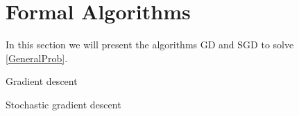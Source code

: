 \section{Formal Algorithms}\label{app:formal_algorithms}
In this section we will present the algorithms GD and SGD to solve \eqref{GeneralProb}.

\begin{algorithm}[H] 
    \caption{Gradient descent}
\end{algorithm}

\begin{algorithm}[H]
    \caption{Stochastic gradient descent}
\end{algorithm}